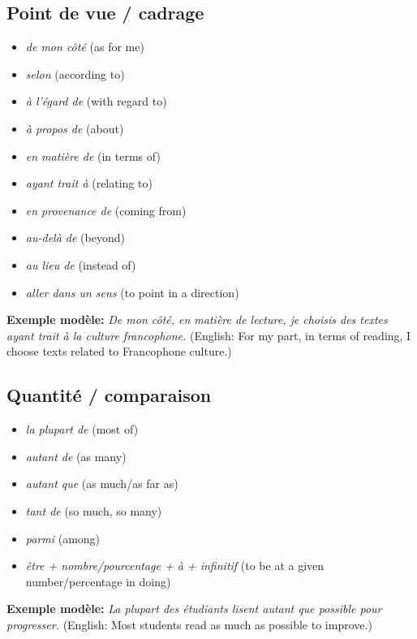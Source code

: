 \documentclass{article}
\begin{document}
\subsection{Point de vue / cadrage}
\begin{itemize}
    \item \textit{de mon côté} (as for me)
    \item \textit{selon} (according to)
    \item \textit{à l'égard de} (with regard to)
    \item \textit{à propos de} (about)
    \item \textit{en matière de} (in terms of)
    \item \textit{ayant trait à} (relating to)
    \item \textit{en provenance de} (coming from)
    \item \textit{au-delà de} (beyond)
    \item \textit{au lieu de} (instead of)
    \item \textit{aller dans un sens} (to point in a direction)
\end{itemize}
\textbf{Exemple modèle:} \textit{De mon côté, en matière de lecture, je choisis des textes ayant trait à la culture francophone.} (English: For my part, in terms of reading, I choose texts related to Francophone culture.)

\subsection{Quantité / comparaison}
\begin{itemize}
    \item \textit{la plupart de} (most of)
    \item \textit{autant de} (as many)
    \item \textit{autant que} (as much/as far as)
    \item \textit{tant de} (so much, so many)
    \item \textit{parmi} (among)
    \item \textit{être + nombre/pourcentage + à + infinitif} (to be at a given number/percentage in doing)
\end{itemize}
\textbf{Exemple modèle:} \textit{La plupart des étudiants lisent autant que possible pour progresser.} (English: Most students read as much as possible to improve.)
\end{document}
